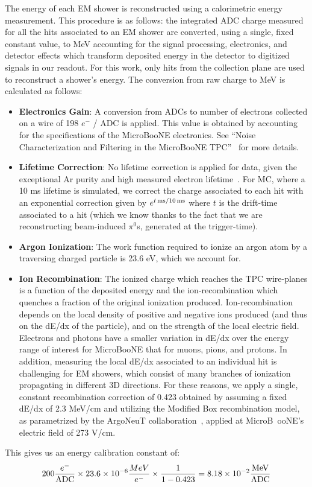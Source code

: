 \documentclass[12pt]{article}
\begin{document}
\par The energy of each EM shower is reconstructed using a calorimetric energy measurement. This procedure is as follows: the integrated ADC charge measured for all the hits associated to an EM shower are converted, using a single, fixed constant value, to MeV accounting for the signal processing, electronics, and detector effects which transform deposited energy in the detector to digitized signals in our readout. For this work, only hits from the collection plane are used to reconstruct a shower's energy. The conversion from raw charge to MeV is calculated as follows:
\begin{itemize}
\item {\bf Electronics Gain}: A conversion from ADCs to number of electrons collected on a wire of 198 $e^-$ / ADC is applied. This value is obtained by accounting for the specifications of the MicroBooNE electronics. See ``Noise Characterization and Filtering in the MicroBooNE TPC''~\cite{bib:noise} for more details.
\item {\bf Lifetime Correction}: No lifetime correction is applied for data, given the exceptional Ar purity and high measured electron lifetime~\cite{bib:purity}. For MC, where a 10 ms lifetime is simulated, we correct the charge associated to each hit with an exponential correction given by $e^{t \,{\rm ms} / 10 \,{\rm ms} }$ where $t$ is the drift-time associated to a hit (which we know thanks to the fact that we are reconstructing beam-induced $\pi^0$s, generated at the trigger-time).
\item {\bf Argon Ionization}: The work function required to ionize an argon atom by a traversing charged particle is 23.6 eV, which we account for.
\item {\bf Ion Recombination}: The ionized charge which reaches the TPC wire-planes is a function of the deposited energy and the ion-recombination which quenches a fraction of the original ionization produced. Ion-recombination depends on the local density of positive and negative ions produced (and thus on the dE/dx of the particle), and on the strength of the local electric field. Electrons and photons have a smaller variation in dE/dx over the energy range of interest for MicroBooNE that for muons, pions, and protons. In addition, measuring the local dE/dx associated to an individual hit is challenging for EM showers, which consist of many branches of ionization propagating in different 3D directions. For these reasons, we apply a single, constant recombination correction of 0.423 obtained by assuming a fixed dE/dx of 2.3 MeV/cm and utilizing the Modified Box recombination model, as parametrized by the ArgoNeuT collaboration~\cite{bib:argoneut_recomb}, applied at MicroB\
ooNE's electric field of 273 V/cm.
\end{itemize}
This gives us an energy calibration constant of:
\begin{equation}
  200 \frac{e^-}{\rm ADC} \times 23.6 \times 10^{-6} \frac{MeV}{e^-} \times \frac{1}{1-0.423} = 8.18 \times 10^{-2} \frac{\rm MeV}{\rm ADC}
\end{equation}
\end{document}
